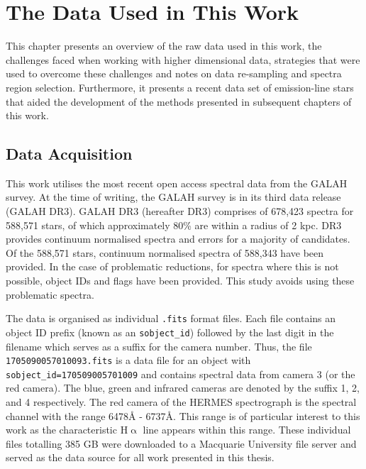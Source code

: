 \chapter{The Data Used in This Work}

This chapter presents an overview of the raw data used in this work, the challenges faced when working with higher dimensional data, strategies that were used to overcome these challenges and notes on data re-sampling and spectra region selection. Furthermore, it presents a recent data set of emission-line stars that aided the development of the methods presented in subsequent chapters of this work.

\section{Data Acquisition}

This work utilises the most recent open access spectral data from the GALAH survey. At the time of writing, the GALAH survey is in its third data release (GALAH DR3). GALAH DR3 (hereafter DR3) comprises of 678,423 spectra for 588,571 stars, of which approximately 80\% are within a radius of 2 kpc\cite{buder2021galah+}. DR3 provides continuum normalised spectra and errors for a majority of candidates. Of the 588,571 stars, continuum normalised spectra of 588,343 have been provided. In the case of problematic reductions, for spectra where this is not possible, object IDs and flags have been provided. This study avoids using these problematic spectra.

The data is organised as individual \texttt{.fits} format files. Each file contains an object ID prefix (known as an \texttt{sobject\_id}) followed by the last digit in the filename which serves as a suffix for the camera number. Thus, the file \texttt{1705090057010093.fits} is a data file for an object with \texttt{sobject\_id=170509005701009} and contains spectral data from camera 3 (or the red camera). The blue, green and infrared cameras are denoted by the suffix 1, 2, and 4 respectively.
The red camera of the HERMES spectrograph is the spectral channel with the range 6478\r{A} - 6737\r{A}\cite{sheinis2014first}. This range is of particular interest to this work as the characteristic H$\upalpha$ line appears within this range. These individual files totalling 385 GB were downloaded to a Macquarie University file server and served as the data source for all work presented in this thesis.

